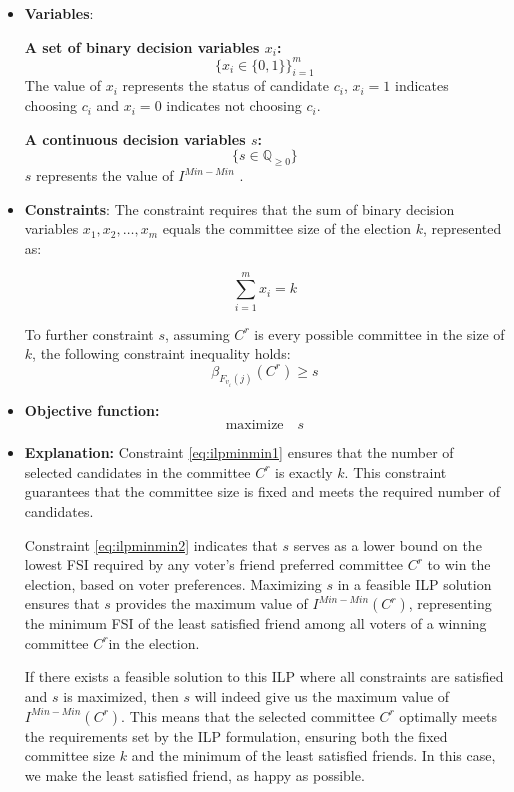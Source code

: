 \documentclass{article}
\begin{document}
\begin{itemize}

  \item \textbf{Variables}: 

\textbf{A set of binary decision variables $x_i$:} \[ \bigg\{ x_i \in \{0, 1\} \bigg\}_{i=1}^m \] The value of $x_i$ represents the status of candidate $c_i$, \(x_i = 1\) indicates choosing $c_i$ and \(x_i = 0\) indicates not choosing $c_i$.

\textbf{A continuous decision variables $s$:} 
\[ \bigg\{ s \in \mathbb{Q}_{\geq 0} \bigg\} \] 
$s$ represents the value of $I^{Min-Min}$ .
    \item \textbf{Constraints}:
The constraint requires that the sum of binary decision variables \(x_1, x_2, \ldots, x_m\) equals the committee size of the election \(k\), represented as:

\begin{equation} \sum_{i=1}^m x_i = k     \label{eq:ilpminmin1}
\end{equation}


To further constraint $s$, assuming $C^r$ is every possible committee in the size of $k$, the following constraint inequality holds:
\begin{equation}  \beta_{F_{v_i}(j)}(C^{r}) \geq s     \label{eq:ilpminmin2}
\end{equation}

  
  \item  \textbf{Objective function:}
  \[\text{maximize} \quad s \]

 \item  \textbf{Explanation:}
Constraint \ref{eq:ilpminmin1} ensures that the number of selected candidates in the committee \(C^r\) is exactly \(k\). This constraint guarantees that the committee size is fixed and meets the required number of candidates.

Constraint \ref{eq:ilpminmin2} indicates that \(s\) serves as a lower bound on the lowest FSI required by any voter's friend preferred committee \(C^r\) to win the election, based on voter preferences. Maximizing \(s\) in a feasible ILP solution ensures that \(s\) provides the maximum value of \(I^{Min-Min}(C^{r})\), representing the minimum FSI of the least satisfied friend among all voters of a winning committee \(C^r\)in the election. 

If there exists a feasible solution to this ILP where all constraints are satisfied and \(s\) is maximized, then \(s\) will indeed give us the maximum value of \(I^{Min-Min}(C^{r})\). This means that the selected committee \(C^r\) optimally meets the requirements set by the ILP formulation, ensuring both the fixed committee size \(k\) and the minimum of the least satisfied friends. In this case, we make the least satisfied friend, as happy as possible.
\end{itemize}
\end{document}

